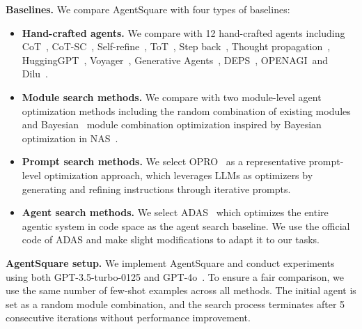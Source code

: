\textbf{Baselines.}
We compare AgentSquare with four types of baselines:
\begin{itemize}[leftmargin=*]
    \item \textbf{Hand-crafted agents.} We compare with 12 hand-crafted agents including CoT~\citep{wei2022chain}, CoT-SC~\citep{wang2023selfconsistency}, Self-refine~\citep{madaan2024self}, ToT~\citep{yao2024tree}, Step back~\citep{zheng2024take}, Thought propagation~\citep{yu2024thought}, HuggingGPT~\citep{shen2024hugginggpt}, Voyager~\citep{wang2024voyager}, Generative Agents~\citep{park2023generative}, DEPS~\citep{wang2024describe}, OPENAGI~\citep{ge2024openagi}and Dilu~\citep{wen2024dilu}. 
    \item \textbf{Module search methods.} We compare with two module-level agent optimization methods including the random combination of existing modules and Bayesian~\citep{zhou2019bayesnas} module combination optimization inspired by Bayesian optimization in NAS~\citep{white2021bananas}.
    \item \textbf{Prompt search methods.} 
    We select OPRO~\citep{yang2024large} as a representative prompt-level optimization approach, which leverages LLMs as optimizers by generating and refining instructions through iterative prompts.
    \item \textbf{Agent search methods.} We select ADAS~\citep{hu2024automated} which optimizes the entire agentic system in code space as the agent search baseline. We use the official code of ADAS and make slight modifications to adapt it to our tasks. 
\end{itemize}

\textbf{AgentSquare setup.}
We implement AgentSquare and conduct experiments using both GPT-3.5-turbo-0125 and GPT-4o~\citep{achiam2023gpt}. To ensure a fair comparison, we use the same number of few-shot examples across all methods. The initial agent is set as a random module combination, and the search process terminates after 5 consecutive iterations without performance improvement.

